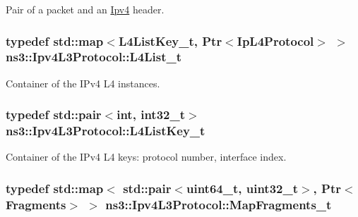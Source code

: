 Pair of a packet and an \hyperlink{classns3_1_1Ipv4}{Ipv4} header. 

\subsubsection[{\texorpdfstring{L4\+List\+\_\+t}{L4List_t}}]{\setlength{\rightskip}{0pt plus 5cm}typedef std\+::map$<${\bf L4\+List\+Key\+\_\+t}, {\bf Ptr}$<${\bf Ip\+L4\+Protocol}$>$ $>$ {\bf ns3\+::\+Ipv4\+L3\+Protocol\+::\+L4\+List\+\_\+t}\hspace{0.3cm}{\ttfamily [private]}}\hypertarget{classns3_1_1Ipv4L3Protocol_aca93327d3f9e0fdce61d3e72927bd018}{}\label{classns3_1_1Ipv4L3Protocol_aca93327d3f9e0fdce61d3e72927bd018}


Container of the I\+Pv4 L4 instances. 

\subsubsection[{\texorpdfstring{L4\+List\+Key\+\_\+t}{L4ListKey_t}}]{\setlength{\rightskip}{0pt plus 5cm}typedef std\+::pair$<$int, int32\+\_\+t$>$ {\bf ns3\+::\+Ipv4\+L3\+Protocol\+::\+L4\+List\+Key\+\_\+t}\hspace{0.3cm}{\ttfamily [private]}}\hypertarget{classns3_1_1Ipv4L3Protocol_af8c2f6a17623a26e68c785ab1676d91c}{}\label{classns3_1_1Ipv4L3Protocol_af8c2f6a17623a26e68c785ab1676d91c}


Container of the I\+Pv4 L4 keys\+: protocol number, interface index. 

\subsubsection[{\texorpdfstring{Map\+Fragments\+\_\+t}{MapFragments_t}}]{\setlength{\rightskip}{0pt plus 5cm}typedef std\+::map$<$ std\+::pair$<$uint64\+\_\+t, uint32\+\_\+t$>$, {\bf Ptr}$<${\bf Fragments}$>$ $>$ {\bf ns3\+::\+Ipv4\+L3\+Protocol\+::\+Map\+Fragments\+\_\+t}\hspace{0.3cm}{\ttfamily [private]}}\hypertarget{classns3_1_1Ipv4L3Protocol_ac2b81caa9436d6a015bbbb68b6282481}{}\label{classns3_1_1Ipv4L3Protocol_ac2b81caa9436d6a015bbbb68b6282481}



